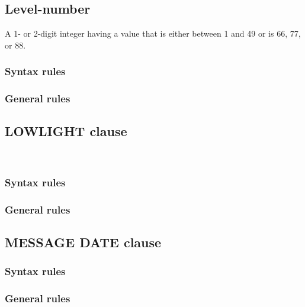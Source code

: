 \subsection{Level-number}

A 1- or 2-digit integer having a value that is either between 1 and 49 or is 66, 77,  or 88.

\subsubsection{Syntax rules}

\subsubsection{General rules}

\subsection{LOWLIGHT clause}

\begin{syntax}
  \begin{1=}
     \\
  \end{1=}
\end{syntax}

\subsubsection{Syntax rules}

\subsubsection{General rules}

\subsection{MESSAGE DATE clause}

\begin{syntax}[\deletedcolour]
\end{syntax}

\subsubsection{Syntax rules}

\subsubsection{General rules}

